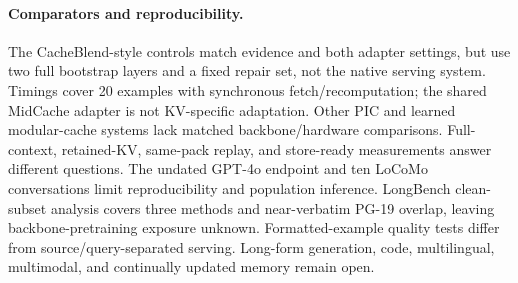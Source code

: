 \paragraph{Comparators and reproducibility.}
The CacheBlend-style controls match evidence and both adapter settings, but use two full bootstrap layers and a fixed repair set, not the native serving system. Timings cover 20 examples with synchronous fetch/recomputation; the shared MidCache adapter is not KV-specific adaptation. Other PIC and learned modular-cache systems lack matched backbone/hardware comparisons. Full-context, retained-KV, same-pack replay, and store-ready measurements answer different questions. The undated GPT-4o endpoint and ten LoCoMo conversations limit reproducibility and population inference. LongBench clean-subset analysis covers three methods and near-verbatim PG-19 overlap, leaving backbone-pretraining exposure unknown. Formatted-example quality tests differ from source/query-separated serving. Long-form generation, code, multilingual, multimodal, and continually updated memory remain open.
